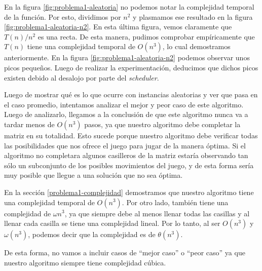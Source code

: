 En la figura \ref{fig:problema1-aleatoria} no podemos notar la complejidad temporal de la función. Por esto, dividimos por $n^2$ y plasmamos ese resultado en la figura \ref{fig:problema1-aleatoria-n2}. En esta última figura, vemos claramente que $T(n) / n ^ 2$ es una recta. De esta manera, pudimos comprobar empíricamente que $T(n)$ tiene una complejidad temporal de $O(n^3)$, lo cual demostramos anteriormente. En la figura \ref{fig:problema1-aleatoria-n2} podemos observar unos picos pequeños. Luego de realizar la experimentación, deducimos que dichos picos existen debido al desalojo por parte del \emph{scheduler}.

Luego de mostrar qué es lo que ocurre con instancias aleatorias y ver que pasa en el caso promedio, intentamos analizar el mejor y peor caso de este algoritmo. Luego de analizarlo, llegamos a la conclusión de que este algoritmo nunca va a tardar menos de $O(n^3)$ pasos, ya que nuestro algoritmo debe completar la matriz en su totalidad. Esto sucede porque nuestro algoritmo debe verificar todas las posibilidades que nos ofrece el juego para jugar de la manera óptima. Si el algoritmo no completara algunos casilleros de la matriz estaría observando tan sólo un subconjunto de los posibles movimientos del juego, y de esta forma sería muy posible que llegue a una solución que no sea óptima.

En la sección \ref{problema1-complejidad} demostramos que nuestro algoritmo tiene una complejidad temporal de $O(n^3)$. Por otro lado, también tiene una complejidad de $\omega{n^3}$, ya que siempre debe al menos llenar todas las casillas y al llenar cada casilla se tiene una complejidad lineal. Por lo tanto, al ser $O(n^3)$ y $\omega(n^3)$, podemos decir que la complejidad es de $\theta(n^3)$.

De esta forma, no vamos a incluir casos de ``mejor caso'' o ``peor caso'' ya que nuestro algoritmo siempre tiene complejidad cúbica.